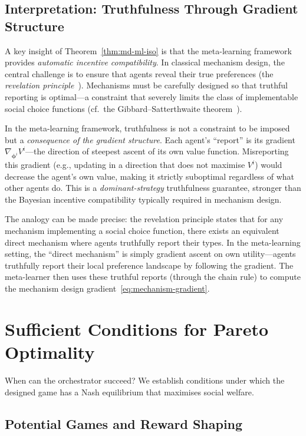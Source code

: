 \subsection{Interpretation: Truthfulness Through Gradient Structure}
\label{subsec:truthfulness}

A key insight of Theorem~\ref{thm:md-ml-iso} is that the meta-learning framework provides \emph{automatic incentive compatibility}. In classical mechanism design, the central challenge is to ensure that agents reveal their true preferences (the \emph{revelation principle}~\cite{myerson1981}). Mechanisms must be carefully designed so that truthful reporting is optimal---a constraint that severely limits the class of implementable social choice functions (cf.\ the Gibbard--Satterthwaite theorem~\cite{gibbard1973}).

In the meta-learning framework, truthfulness is not a constraint to be imposed but a \emph{consequence of the gradient structure}. Each agent's ``report'' is its gradient $\nabla_{\bm{\phi}^i} V^i$---the direction of steepest ascent of its own value function. Misreporting this gradient (e.g., updating in a direction that does not maximise $V^i$) would decrease the agent's own value, making it strictly suboptimal regardless of what other agents do. This is a \emph{dominant-strategy} truthfulness guarantee, stronger than the Bayesian incentive compatibility typically required in mechanism design.

The analogy can be made precise: the revelation principle states that for any mechanism implementing a social choice function, there exists an equivalent direct mechanism where agents truthfully report their types. In the meta-learning setting, the ``direct mechanism'' is simply gradient ascent on own utility---agents truthfully report their local preference landscape by following the gradient. The meta-learner then uses these truthful reports (through the chain rule) to compute the mechanism design gradient~\eqref{eq:mechanism-gradient}.

\section{Sufficient Conditions for Pareto Optimality}
\label{sec:pareto-conditions}

When can the orchestrator succeed? We establish conditions under which the designed game has a Nash equilibrium that maximises social welfare.

\subsection{Potential Games and Reward Shaping}
\label{subsec:potential-games}

